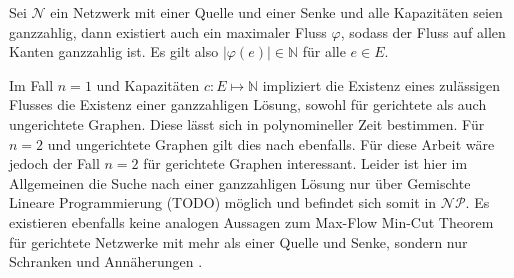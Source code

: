 \begin{theorem}\label{theo_int_flow}
Sei $\mathcal{N}$ ein Netzwerk mit einer Quelle und einer Senke und alle Kapazitäten seien ganzzahlig, dann existiert auch ein maximaler Fluss $\varphi$, sodass der Fluss auf allen Kanten ganzzahlig ist. Es gilt also $|\varphi(e)| \in \mathbb{N}$ für alle $e\in E$.
\end{theorem}

\begin{remark}
Im Fall $n=1$ und Kapazitäten $c:E\mapsto\mathbb{N}$ impliziert die Existenz eines zulässigen Flusses die Existenz einer ganzzahligen Lösung, sowohl für gerichtete als auch ungerichtete Graphen. Diese lässt sich in polynomineller Zeit bestimmen. Für $n=2$ und ungerichtete Graphen gilt dies nach \cite{hu} ebenfalls. Für diese Arbeit wäre jedoch der Fall $n=2$ für gerichtete Graphen interessant. Leider ist hier im Allgemeinen die Suche nach einer ganzzahligen Lösung nur über Gemischte Lineare Programmierung (TODO) möglich und befindet sich somit in $\mathcal{NP}$. Es existieren ebenfalls keine analogen Aussagen zum Max-Flow Min-Cut Theorem für gerichtete Netzwerke mit mehr als einer Quelle und Senke, sondern nur Schranken und Annäherungen \cite{leighton99}.
\end{remark}